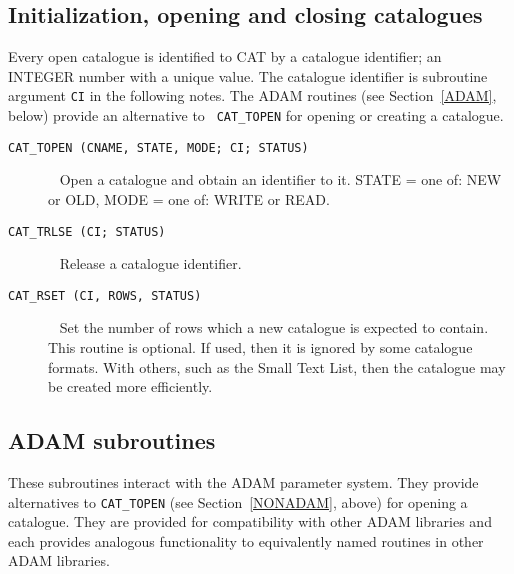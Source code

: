


\subsection{\label{NONADAM}Initialization, opening and closing catalogues}

Every open catalogue is identified to CAT by a catalogue identifier;
an INTEGER number with a unique value. The catalogue identifier is
subroutine argument {\tt CI} in the following notes. The ADAM routines
(see Section~\ref{ADAM}, below) provide an alternative to {\tt
CAT\_TOPEN} for opening or creating a catalogue.

\begin{description}

  \item[ {\tt CAT\_TOPEN (CNAME, STATE, MODE; CI; STATUS) } ] ~
  \newline Open a catalogue and obtain an identifier to it.
  \newline STATE = one of: NEW or OLD,
  \newline MODE = one of: WRITE or READ.

  \item[ {\tt CAT\_TRLSE (CI; STATUS) } ] ~
  \newline Release a catalogue identifier.

  \item[ {\tt CAT\_RSET (CI, ROWS, STATUS) } ] ~
  \newline Set the number of rows which a new catalogue is expected to
   contain.  This routine is optional.  If used, then it is ignored by
   some catalogue formats.  With others, such as the Small Text List,
   then the catalogue may be created more efficiently.

\end{description}


\subsection{\label{ADAM}ADAM subroutines}

These subroutines interact with the ADAM parameter system. They provide
alternatives to {\tt CAT\_TOPEN} (see Section~\ref{NONADAM}, above) for
opening a catalogue. They are provided for compatibility with other
ADAM libraries and each provides analogous functionality to equivalently
named routines in other ADAM libraries.

